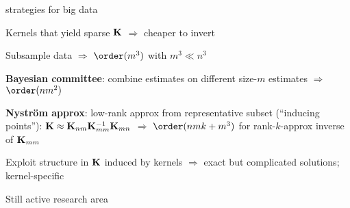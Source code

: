 \documentclass[11pt,compress,t,notes=noshow, xcolor=table]{beamer}
\begin{document}
\begin{framei}[sep=L]{strategies for big data}
\item Kernels that yield sparse $\mathbf{K}$ $\Rightarrow$ cheaper to invert
\item Subsample data $\Rightarrow$ $\order(m^3)$ with $m^3 \ll n^3$
\item \textbf{Bayesian committee}: combine estimates on different size-$m$ estimates $\Rightarrow$ $\order(nm^2)$
\item \textbf{Nyström approx}: low-rank approx from representative subset (``inducing points''): $\mathbf{K} \approx \mathbf{K}_{nm}\mathbf{K}_{mm}^{-1}\mathbf{K}_{mn}$ $\Rightarrow$ $\order(nmk + m^3)$ for rank-$k$-approx inverse of $\mathbf{K}_{mm}$
\item Exploit structure in $\mathbf{K}$ induced by kernels $\Rightarrow$ exact but complicated solutions; kernel-specific
\item Still active research area
\end{framei}

% 
% 
% 
% 
% 
% 

\endlecture
\end{document}

